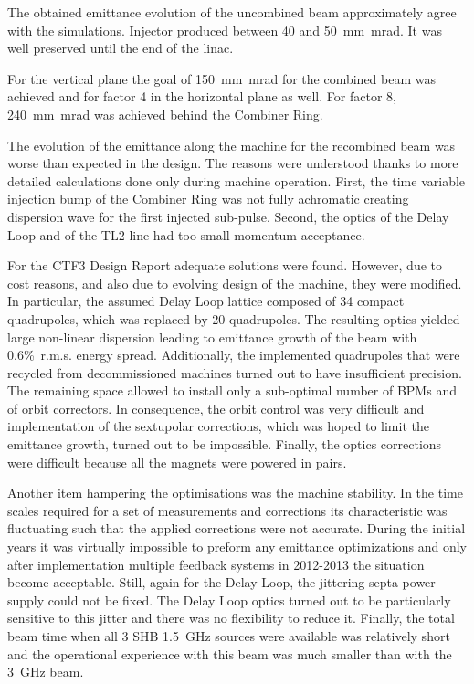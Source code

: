 The obtained emittance evolution of the uncombined beam approximately agree with the simulations. 
Injector produced between 40 and 50~mm~mrad. It was well preserved until the end of the linac.

For the vertical plane the goal of 150~mm~mrad for the combined beam was achieved and 
for factor 4 in the horizontal plane as well. For factor 8, 240~mm~mrad was achieved behind the Combiner Ring.


The evolution of the emittance along the machine for the recombined beam 
was worse than expected in the design.
The reasons were understood thanks to more detailed calculations done only during machine operation.
First, the time variable injection bump of the Combiner Ring was not fully achromatic 
creating dispersion wave for the first injected sub-pulse.
Second, the optics of the Delay Loop and of the TL2 line had too small momentum acceptance.



For the CTF3 Design Report adequate solutions were found. However, due to cost reasons,
and also due to evolving design of the machine, they were modified.
In particular, the assumed Delay Loop lattice composed of 34 compact quadrupoles, 
which was replaced by 20 quadrupoles. 
The resulting optics yielded large non-linear dispersion leading to emittance growth 
of the beam with 0.6\%~r.m.s. energy spread. 
Additionally, the implemented quadrupoles that were recycled from decommissioned machines
turned out to have insufficient precision. 
The remaining space allowed to install only a sub-optimal number of BPMs and of orbit correctors. 
In consequence, the orbit control was very difficult and implementation of the sextupolar corrections,
which was hoped to limit the emittance growth, turned out to be impossible.
Finally, the optics corrections were difficult because all the magnets were powered in pairs.

Another item hampering the optimisations was the machine stability. 
In the time scales required for a set of measurements and corrections its characteristic was fluctuating 
such that the applied corrections were not accurate.
During the initial years it was virtually impossible to preform any emittance optimizations 
and only after implementation multiple feedback systems in 2012-2013 the situation become acceptable.
Still, again for the Delay Loop, the jittering septa power supply could not be fixed.
The Delay Loop optics turned out to be particularly sensitive to this jitter and 
there was no flexibility to reduce it. 
Finally, the total beam time when all 3 SHB 1.5~GHz sources were available was relatively short
and the operational experience with this beam was much smaller than with the 3~GHz beam. 



